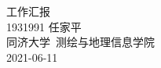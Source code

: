 \documentclass[a4paper, 12pt]{article}
\begin{document}
\begin{center}
    {\Huge 
        工作汇报}\\[20pt]
    

    {\Large 
        1931991 任家平\\[12pt]
        同济大学~测绘与地理信息学院\\[12pt]
        2021-06-11}
\end{center}
\thispagestyle{empty}



\newpage
{}



% 
\end{document}
